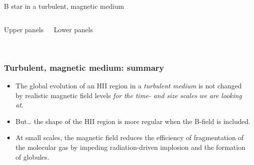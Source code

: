 \documentclass{beamer}
\begin{document}
\begin{frame}{B star in a turbulent, magnetic medium}
  \begin{columns}
    \begin{block}{Upper panels}
      \color{red}{[S\,II]}\quad
      \color{green}{[N\,II]}\quad
      \color{blue}{H\large\bfseries\begin{greek}a\end{greek}}
    \end{block}
    \begin{block}{Lower panels}
      \color{red}{FIR Cold dust}\\
      \color{green}{MIR Warm~PAHs}\\
      \color{blue}{Radio Free-free}
    \end{block}
  \end{columns}
\end{frame}

\begin{frame}
  \frametitle{Turbulent, magnetic medium: summary}
  \linespread{1.3}\selectfont
  \begin{itemize}
  \item The global evolution of an HII region in a \textit{turbulent
      medium} is not changed by 
    realistic magnetic field levels \textit{\alert{for the time- and
        size scales we are looking at}}.
  \item But\dots 
    the shape of the HII region is more regular when the B-field is included.
  \item At small scales, the magnetic field
    reduces the efficiency of fragmentation of the molecular gas by impeding
    radiation-driven implosion and the formation of globules.
  \end{itemize}
\end{frame}
\end{document}
